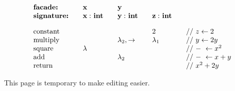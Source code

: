 \documentclass[twoside]{article}
\newcommand{\bfmbox}[1]{\mbox{\bfseries #1}}
\newcommand{\col}[1][0ex]{& \hspace{#1}}
\begin{document}
\newpage

$$ \begin{array}{lllll}
\bfmbox{facade:}    \col[1em] \mathbf{x}                \col[1em] \mathbf{y}                                                    \\
\bfmbox{signature:} \col[1em] \mathbf{x:\ }\bfmbox{int}	\col[1em] \mathbf{y:\ }\bfmbox{int} \col[1em] \mathbf{z:\ }\bfmbox{int} \\[1em]

\mbox{constant}     \col[1em]                           \col[1em]                           \col[1em] 2
		    \col[1em] \mbox{// } z \leftarrow 2                                                                         \\
\mbox{multiply}     \col[1em]                           \col[1em] \lambda_2, \to            \col[1em] \lambda_1
		    \col[1em] \mbox{// } y \leftarrow 2y                                                                        \\
\mbox{square}       \col[1em] \lambda                   \col[1em]                           \col[1em]
		    \col[1em] \mbox{// } - \ \leftarrow x^2                                                                     \\
\mbox{add}          \col[1em]                           \col[1em] \lambda_2                 \col[1em]
		    \col[1em] \mbox{// } - \ \leftarrow x+y                                                                     \\
\mbox{return}       \col[1em]                          \col[1em]                            \col[1em]
		    \col[1em] \mbox{// } x^2+2y
\end{array} $$

\newpage

This page is temporary to make editing easier.
\end{document}
